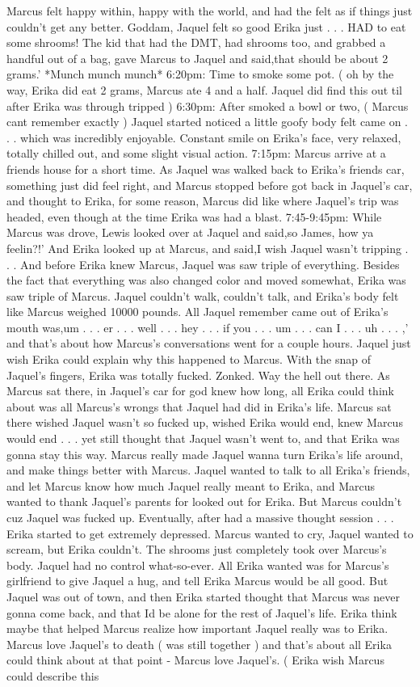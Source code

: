 \documentclass[12pt]{book}
\begin{document}
Marcus felt happy within, happy with the world, and had the felt as if things just couldn't get any better. Goddam, Jaquel felt so good Erika just . . .  HAD to eat some shrooms! The kid that had the DMT, had shrooms too, and grabbed a handful out of a bag, gave Marcus to Jaquel and said,that should be about 2 grams.' *Munch munch munch* 6:20pm: Time to smoke some pot. ( oh by the way, Erika did eat 2 grams, Marcus ate 4 and a half. Jaquel did find this out til after Erika was through tripped ) 6:30pm: After smoked a bowl or two, ( Marcus cant remember exactly ) Jaquel started noticed a little goofy body felt came on . . .  which was incredibly enjoyable. Constant smile on Erika's face, very relaxed, totally chilled out, and some slight visual action. 7:15pm: Marcus arrive at a friends house for a short time. As Jaquel was walked back to Erika's friends car, something just did feel right, and Marcus stopped before got back in Jaquel's car, and thought to Erika, for some reason, Marcus did like where Jaquel's trip was headed, even though at the time Erika was had a blast. 7:45-9:45pm: While Marcus was drove, Lewis looked over at Jaquel and said,so James, how ya feelin?!' And Erika looked up at Marcus, and said,I wish Jaquel wasn't tripping . . .  And before Erika knew Marcus, Jaquel was saw triple of everything. Besides the fact that everything was also changed color and moved somewhat, Erika was saw triple of Marcus. Jaquel couldn't walk, couldn't talk, and Erika's body felt like Marcus weighed 10000 pounds. All Jaquel remember came out of Erika's mouth was,um . . .  er . . .  well . . .  hey . . .  if you . . .  um . . .  can I . . .  uh . . .  ,' and that's about how Marcus's conversations went for a couple hours. Jaquel just wish Erika could explain why this happened to Marcus. With the snap of Jaquel's fingers, Erika was totally fucked. Zonked. Way the hell out there. As Marcus sat there, in Jaquel's car for god knew how long, all Erika could think about was all Marcus's wrongs that Jaquel had did in Erika's life. Marcus sat there wished Jaquel wasn't so fucked up, wished Erika would end, knew Marcus would end . . .  yet still thought that Jaquel wasn't went to, and that Erika was gonna stay this way. Marcus really made Jaquel wanna turn Erika's life around, and make things better with Marcus. Jaquel wanted to talk to all Erika's friends, and let Marcus know how much Jaquel really meant to Erika, and Marcus wanted to thank Jaquel's parents for looked out for Erika. But Marcus couldn't cuz Jaquel was fucked up. Eventually, after had a massive thought session . . .  Erika started to get extremely depressed. Marcus wanted to cry, Jaquel wanted to scream, but Erika couldn't. The shrooms just completely took over Marcus's body. Jaquel had no control what-so-ever. All Erika wanted was for Marcus's girlfriend to give Jaquel a hug, and tell Erika Marcus would be all good. But Jaquel was out of town, and then Erika started thought that Marcus was never gonna come back, and that Id be alone for the rest of Jaquel's life. Erika think maybe that helped Marcus realize how important Jaquel really was to Erika. Marcus love Jaquel's to death ( was still together ) and that's about all Erika could think about at that point - Marcus love Jaquel's. ( Erika wish Marcus could describe this 
\end{document}
